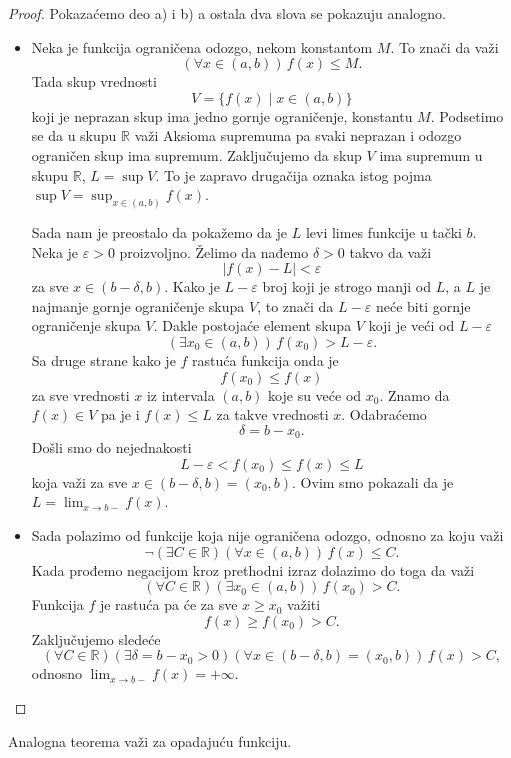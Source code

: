 \documentclass[a4paper,12pt]{article}
\theoremstyle{plain}
\theoremstyle{definition}
\theoremstyle{remark}
\begin{document}
\begin{proof}
Pokazaćemo deo a) i b) a ostala dva slova se pokazuju analogno.
\begin{itemize}
    \item[a)] Neka je funkcija ograničena odozgo, nekom konstantom $M$. To znači da važi
    $$(\forall x \in (a,b)) \, f(x) \le M.$$
    Tada skup vrednosti
    $$V = \{f(x) \mid x \in (a,b)\}$$
    koji je neprazan skup ima jedno gornje ograničenje, konstantu $M$. Podsetimo se da u skupu $\mathbb{R}$ važi Aksioma supremuma pa svaki neprazan i odozgo ograničen skup ima supremum. Zaključujemo da skup $V$ ima supremum u skupu $\mathbb{R}$, $L = \sup V$. To je zapravo drugačija oznaka istog pojma $\sup V = \sup_{x \in (a,b)} f(x)$.
    
    Sada nam je preostalo da pokažemo da je $L$ levi limes funkcije u tački $b$. Neka je $\varepsilon > 0$ proizvoljno. Želimo da nađemo $\delta > 0$ takvo da važi
    $$|f(x) - L| < \varepsilon$$
    za sve $x \in (b-\delta, b)$. Kako je $L - \varepsilon$ broj koji je strogo manji od $L$, a $L$ je najmanje gornje ograničenje skupa $V$, to znači da $L - \varepsilon$ neće biti gornje ograničenje skupa $V$. Dakle postojaće element skupa $V$ koji je veći od $L - \varepsilon$
    $$(\exists x_0 \in (a,b)) \, f(x_0) > L - \varepsilon.$$
    Sa druge strane kako je $f$ rastuća funkcija onda je
    $$f(x_0) \le f(x)$$
    za sve vrednosti $x$ iz intervala $(a,b)$ koje su veće od $x_0$. Znamo da $f(x) \in V$ pa je i $f(x) \le L$ za takve vrednosti $x$. Odabraćemo
    $$\delta = b - x_0.$$
    Došli smo do nejednakosti
    $$L - \varepsilon < f(x_0) \le f(x) \le L$$
    koja važi za sve $x \in (b-\delta, b) = (x_0, b)$. Ovim smo pokazali da je $L = \lim_{x \to b-} f(x)$.

    \item[b)] Sada polazimo od funkcije koja nije ograničena odozgo, odnosno za koju važi
    $$\neg (\exists C \in \mathbb{R})(\forall x \in (a,b)) \, f(x) \le C.$$
    Kada prođemo negacijom kroz prethodni izraz dolazimo do toga da važi
    $$(\forall C \in \mathbb{R})(\exists x_0 \in (a,b)) \, f(x_0) > C.$$
    Funkcija $f$ je rastuća pa će za sve $x \ge x_0$ važiti
    $$f(x) \ge f(x_0) > C.$$
    Zaključujemo sledeće
    $$(\forall C \in \mathbb{R})(\exists \delta = b - x_0 > 0)(\forall x \in (b-\delta, b) = (x_0, b)) \, f(x) > C,$$
    odnosno $\lim_{x \to b-} f(x) = +\infty$.
\end{itemize}
\end{proof}
Analogna teorema važi za opadajuću funkciju.
\end{document}
